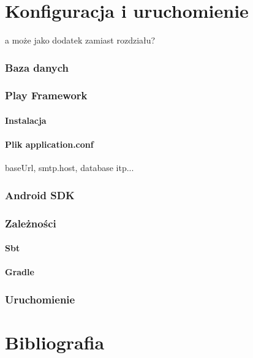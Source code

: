 \documentclass[11pt]{aghdpl}
\begin{document}
\chapter{Konfiguracja i uruchomienie}
a może jako dodatek zamiast rozdziału?

\subsection{Baza danych}
\subsection{Play Framework}
\subsubsection{Instalacja}
\subsubsection{Plik application.conf}
baseUrl, smtp.host, database itp...
\subsection{Android SDK}
\subsection{Zależności}
\subsubsection{Sbt}
\subsubsection{Gradle}
\subsection{Uruchomienie}

% 
% 

\chapter{Bibliografia} %



%
%
%
%
\end{document}
